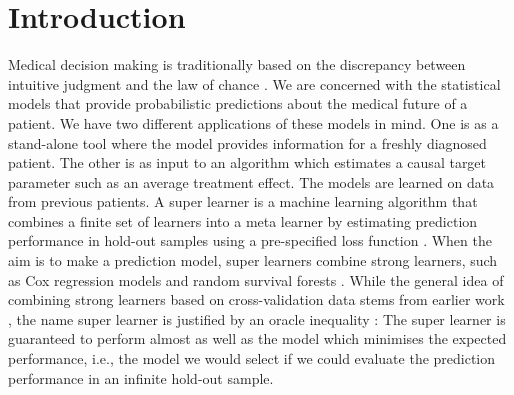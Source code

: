 \documentclass[numsec,webpdf,contemporary,medium,namedate]{oup-authoring-template}%
\theoremstyle{thmstyleone}%
\theoremstyle{thmstyletwo}%
\theoremstyle{thmstylethree}%
\newcommand{\1}{\mathds{1}}
\begin{document}
\section{Introduction}
\label{sec:introduction}

Medical decision making is traditionally based on the discrepancy
between intuitive judgment and the law of chance
\citep{redelmeier1995probability}. We are concerned with the
statistical models that provide probabilistic predictions about the
medical future of a patient. We have two different applications of
these models in mind. One is as a stand-alone tool where the model
provides information for a freshly diagnosed patient. The other is as
input to an algorithm which estimates a causal target parameter such
as an average treatment effect. The models are learned on data from
previous patients. A super learner is a machine learning algorithm
that combines a finite set of learners into a meta learner by
estimating prediction performance in hold-out samples using a
pre-specified loss function \citep{van2007super}. When the aim is to
make a prediction model, super learners combine strong learners, such
as Cox regression models and random survival forests
\citep{gerds2021medical}.
While the general idea of combining strong learners based on cross-validation
data stems from earlier work \citep{wolpert1992stacked,breiman1996stacked}, the
name super learner is justified by an oracle inequality
\citep{van2003unicv,vaart2006oracle}: The super learner is guaranteed to perform
almost as well as the model which minimises the expected performance, i.e., the
model we would select if we could evaluate the prediction performance in an
infinite hold-out sample.
\end{document}
